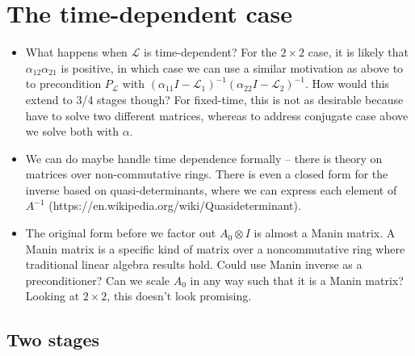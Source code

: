 \documentclass[a4paper,10pt]{article}
\begin{document}
\newpage
\section{The time-dependent case}


{\color{blue}

\begin{itemize}
\item What happens when $\mathcal{L}$ is time-dependent? For the $2\times 2$ case, it is
likely that $\alpha_{12}\alpha_{21}$ is positive, in which case we can use a similar
motivation as above to to precondition $P_{\mathcal{L}}$ with $(\alpha_{11}I - \mathcal{L}_1)^{-1}
(\alpha_{22}I - \mathcal{L}_2)^{-1}$. How would this extend to 3/4 stages though?
For fixed-time, this is not as desirable because have to solve two different
matrices, whereas to address conjugate case above we solve both with $\alpha$.

\item We can do maybe handle time dependence formally -- there is theory on matrices over
non-commutative rings. There is even a closed form for the inverse based on quasi-determinants,
where we can express each element of $A^{-1}$ (https://en.wikipedia.org/wiki/Quasideterminant).

\item The original form before we factor out $A_0\otimes I$ is almost a Manin matrix. A Manin
matrix is a specific kind of matrix over a noncommutative ring where traditional linear
algebra results hold. Could use Manin inverse as a preconditioner? Can we scale $A_0$
in any way such that it is a Manin matrix? Looking at $2\times 2$, this doesn't look
promising.


\end{itemize}

}

\subsection{Two stages}
\end{document}

